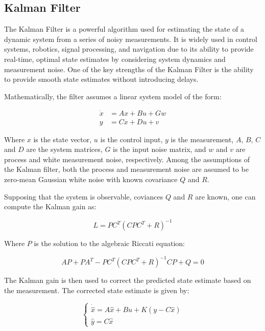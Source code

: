 \subsection{Kalman Filter}
\label{sec:kalman_filter}

The Kalman Filter is a powerful algorithm used for estimating the state of a dynamic system from a series of noisy measurements.
It is widely used in control systems, robotics, signal processing, and navigation due to its ability to provide real-time, optimal state estimates by considering system dynamics and measurement noise.
One of the key strengths of the Kalman Filter is the ability to provide smooth state estimates without introducing delays.

Mathematically, the filter assumes a linear system model of the form:

\begin{equation}
    \begin{aligned}
        \dot{x} & = A x + B u + G w \\
        y       & = C x + D u + v
    \end{aligned}
\end{equation}

Where $x$ is the state vector, $u$ is the control input, $y$ is the measurement, $A$, $B$, $C$ and $D$ are the system matrices, $G$ is the input noise matrix, and $w$ and $v$ are process and white measurement noise, respectively.
Among the assumptions of the Kalman filter, both the process and measurement noise are assumed to be zero-mean Gaussian white noise with known covariance $Q$ and $R$.

Supposing that the system is observable, coviances $Q$ and $R$ are known, one can compute the Kalman gain as:

\begin{equation}
    L = P C^T (C P C^T + R)^{-1}
    \label{eq:kalman_gain}
\end{equation}

Where $P$ is the solution to the algebraic Riccati equation:

\begin{equation}
    A P + P A^T - P C^T (C P C^T + R)^{-1} C P + Q = 0
\end{equation}

The Kalman gain is then used to correct the predicted state estimate based on the measurement.
The corrected state estimate is given by:

\begin{equation}
    \begin{cases}
        \dot{\hat{x}} = A \hat{x} + B u + K(y - C \hat{x}) \\
        \hat{y} = C \hat{x}
    \end{cases}
\end{equation}

